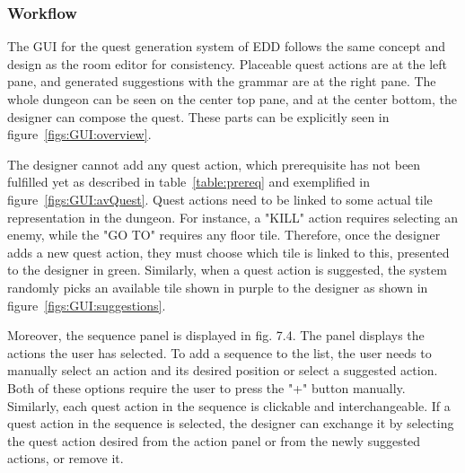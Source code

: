 


\subsubsection{Workflow}

The GUI for the quest generation system of EDD follows the same concept and design as the room editor for consistency. Placeable quest actions are at the left pane, and generated suggestions with the grammar are at the right pane. The whole dungeon can be seen on the center top pane, and at the center bottom, the designer can compose the quest. These parts can be explicitly seen in figure~\ref{figs:GUI:overview}.

The designer cannot add any quest action, which prerequisite has not been fulfilled yet as described in table~\ref{table:prereq} and exemplified in figure~\ref{figs:GUI:avQuest}. Quest actions need to be linked to some actual tile representation in the dungeon. For instance, a "KILL" action requires selecting an enemy, while the "GO TO" requires any floor tile. Therefore, once the designer adds a new quest action, they must choose which tile is linked to this, presented to the designer in green. Similarly, when a quest action is suggested, the system randomly picks an available tile shown in purple to the designer as shown in figure~\ref{figs:GUI:suggestions}.

Moreover, the sequence panel is displayed in fig. 7.4. The panel displays the actions the user has selected. To add a sequence to the list, the user needs to manually select an action and its desired position or select a suggested action. Both of these options require the user to press the "+" button manually. Similarly, each quest action in the sequence is clickable and interchangeable. If a quest action in the sequence is selected, the designer can exchange it by selecting the quest action desired from the action panel or from the newly suggested actions, or remove it.

